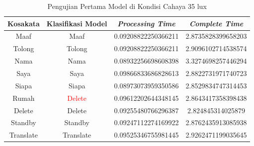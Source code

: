 \begin{longtable}{|c|c|c|c|}
  \caption{Pengujian Pertama Model di Kondisi Cahaya 35 lux}
  \label{tb:prediksigelap1}                                   \\
  \hline
  \rowcolor[HTML]{C0C0C0}
  \textbf{Kosakata} & \textbf{Klasifikasi Model} & \textbf{\emph{Processing Time}} & \textbf{\emph{Complete Time}}\\
  \hline
  Maaf              & Maaf                        & 0.09208822250366211                           & 2.8735828399658203                                  \\
  Tolong            & Tolong                        & 0.09208822250366211                           & 2.9096102714538574                                  \\
  Nama              & Nama                        & 0.08932256698608398                           & 3.3274698257446294                                  \\
  Saya              & Saya                        & 0.09866833686828613                           & 2.8822731971740723                                  \\
  Siapa              & Siapa                        & 0.08973073959350586                           & 2.8529834747314453                                  \\
  Rumah             & \textcolor{red}{Delete}                        & 0.09612202644348145                           & 2.8643417358398438                                  \\
  Delete            & Delete                        & 0.09255480766296387                           & 2.824845314025879                                  \\
  Standby           & Standby                        & 0.09247112274169922                           & 2.8762435913085938                                  \\
  Translate         & Translate                        & 0.09525346755981445                           & 2.9262471199035645                                  \\
  \hline
\end{longtable}

